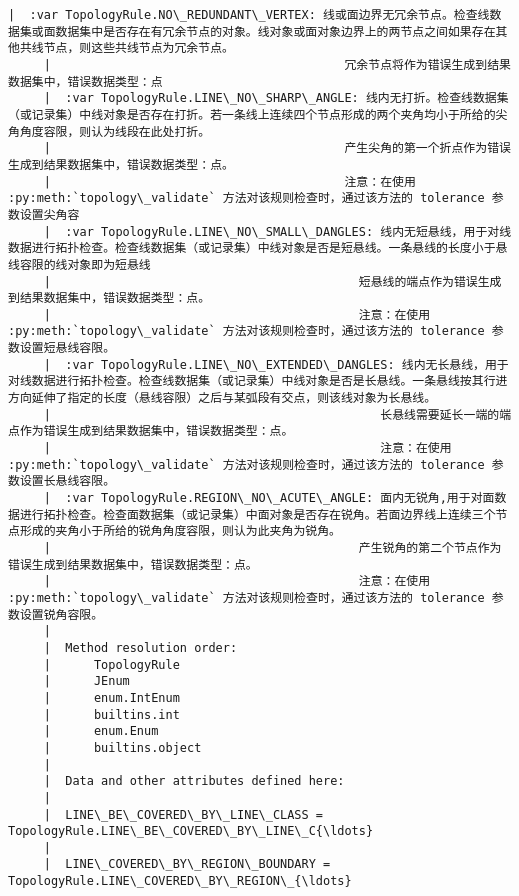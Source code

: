 \documentclass[11pt]{article}
\begin{document}
\begin{Verbatim}[commandchars=\\\{\}]
     |  :var TopologyRule.NO\_REDUNDANT\_VERTEX: 线或面边界无冗余节点。检查线数据集或面数据集中是否存在有冗余节点的对象。线对象或面对象边界上的两节点之间如果存在其他共线节点，则这些共线节点为冗余节点。
     |                                         冗余节点将作为错误生成到结果数据集中，错误数据类型：点
     |  :var TopologyRule.LINE\_NO\_SHARP\_ANGLE: 线内无打折。检查线数据集（或记录集）中线对象是否存在打折。若一条线上连续四个节点形成的两个夹角均小于所给的尖角角度容限，则认为线段在此处打折。
     |                                         产生尖角的第一个折点作为错误生成到结果数据集中，错误数据类型：点。
     |                                         注意：在使用 :py:meth:`topology\_validate` 方法对该规则检查时，通过该方法的 tolerance 参数设置尖角容
     |  :var TopologyRule.LINE\_NO\_SMALL\_DANGLES: 线内无短悬线，用于对线数据进行拓扑检查。检查线数据集（或记录集）中线对象是否是短悬线。一条悬线的长度小于悬线容限的线对象即为短悬线
     |                                           短悬线的端点作为错误生成到结果数据集中，错误数据类型：点。
     |                                           注意：在使用 :py:meth:`topology\_validate` 方法对该规则检查时，通过该方法的 tolerance 参数设置短悬线容限。
     |  :var TopologyRule.LINE\_NO\_EXTENDED\_DANGLES: 线内无长悬线，用于对线数据进行拓扑检查。检查线数据集（或记录集）中线对象是否是长悬线。一条悬线按其行进方向延伸了指定的长度（悬线容限）之后与某弧段有交点，则该线对象为长悬线。
     |                                              长悬线需要延长一端的端点作为错误生成到结果数据集中，错误数据类型：点。
     |                                              注意：在使用 :py:meth:`topology\_validate` 方法对该规则检查时，通过该方法的 tolerance 参数设置长悬线容限。
     |  :var TopologyRule.REGION\_NO\_ACUTE\_ANGLE: 面内无锐角,用于对面数据进行拓扑检查。检查面数据集（或记录集）中面对象是否存在锐角。若面边界线上连续三个节点形成的夹角小于所给的锐角角度容限，则认为此夹角为锐角。
     |                                           产生锐角的第二个节点作为错误生成到结果数据集中，错误数据类型：点。
     |                                           注意：在使用 :py:meth:`topology\_validate` 方法对该规则检查时，通过该方法的 tolerance 参数设置锐角容限。
     |  
     |  Method resolution order:
     |      TopologyRule
     |      JEnum
     |      enum.IntEnum
     |      builtins.int
     |      enum.Enum
     |      builtins.object
     |  
     |  Data and other attributes defined here:
     |  
     |  LINE\_BE\_COVERED\_BY\_LINE\_CLASS = TopologyRule.LINE\_BE\_COVERED\_BY\_LINE\_C{\ldots}
     |  
     |  LINE\_COVERED\_BY\_REGION\_BOUNDARY = TopologyRule.LINE\_COVERED\_BY\_REGION\_{\ldots}

\end{Verbatim}
\end{document}
